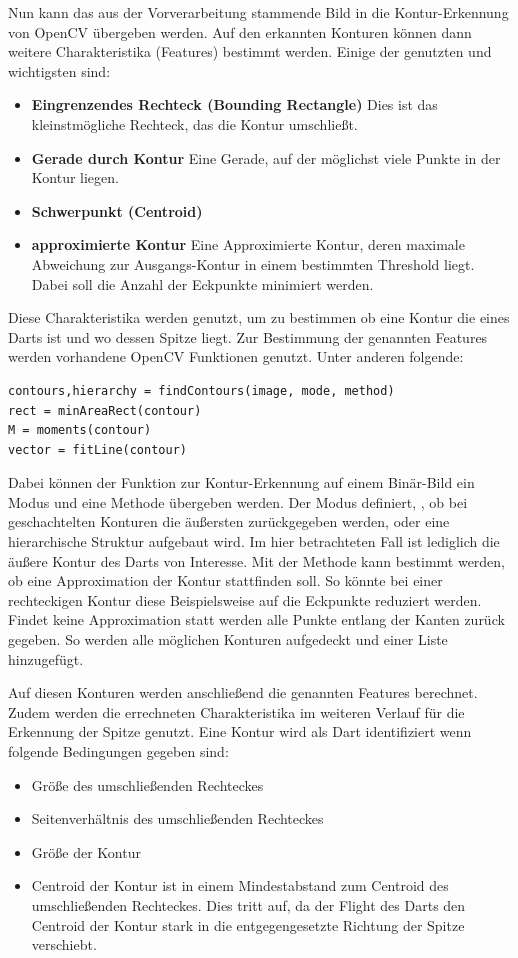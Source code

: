 Nun kann das aus der Vorverarbeitung stammende Bild in die Kontur-Erkennung von OpenCV übergeben werden. Auf den erkannten Konturen können dann weitere Charakteristika (Features) bestimmt werden. Einige der genutzten und wichtigsten sind:
\begin{itemize}
	\item \textbf{Eingrenzendes Rechteck (Bounding Rectangle)} Dies ist das kleinstmögliche Rechteck, das die Kontur umschließt.
	\item \textbf{Gerade durch Kontur} Eine Gerade, auf der möglichst viele Punkte in der Kontur liegen.
	\item \textbf{Schwerpunkt (Centroid)} 
	\item \textbf{approximierte Kontur} Eine Approximierte Kontur, deren maximale Abweichung zur Ausgangs-Kontur in einem bestimmten Threshold liegt. Dabei soll die Anzahl der Eckpunkte minimiert werden.
\end{itemize}
Diese Charakteristika werden genutzt, um zu bestimmen ob eine Kontur die eines Darts ist und wo dessen Spitze liegt. Zur Bestimmung der genannten Features werden vorhandene OpenCV Funktionen genutzt. Unter anderen folgende:
\begin{lstlisting}[frame=single]
contours,hierarchy = findContours(image, mode, method)
rect = minAreaRect(contour)
M = moments(contour)
vector = fitLine(contour)
\end{lstlisting}
Dabei können der Funktion zur Kontur-Erkennung auf einem Binär-Bild ein Modus und eine Methode übergeben werden. Der Modus definiert, , ob bei geschachtelten Konturen die äußersten zurückgegeben werden, oder eine hierarchische Struktur aufgebaut wird. Im hier betrachteten Fall ist lediglich die äußere Kontur des Darts von Interesse. Mit der Methode kann bestimmt werden, ob eine Approximation der Kontur stattfinden soll. So könnte bei einer rechteckigen Kontur diese Beispielsweise auf die Eckpunkte reduziert werden. Findet keine Approximation statt werden alle Punkte entlang der Kanten zurück gegeben. So werden alle möglichen Konturen aufgedeckt und einer Liste hinzugefügt.

Auf diesen Konturen werden anschließend die genannten Features berechnet.
Zudem werden die errechneten Charakteristika im weiteren Verlauf für die Erkennung der Spitze genutzt.
Eine Kontur wird als Dart identifiziert wenn folgende Bedingungen gegeben sind:
\begin{itemize}
	\item Größe des umschließenden Rechteckes
	\item Seitenverhältnis des umschließenden Rechteckes
	\item Größe der Kontur
	\item Centroid der Kontur ist in einem Mindestabstand zum Centroid des umschließenden Rechteckes. Dies tritt auf, da der Flight des Darts den Centroid der Kontur stark in die entgegengesetzte Richtung der Spitze verschiebt. 
\end{itemize}

